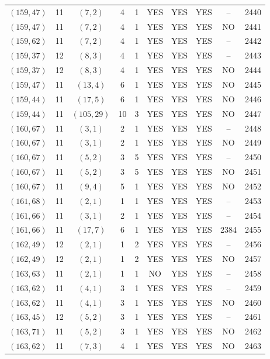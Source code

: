 \begin{longtable}{|c|c|c|c|c|c|c|c|c|c|}
$(159, 47)$ & 11 & $(7, 2)$ & 4 & 1 & YES & YES & YES & -- & 2440\\
$(159, 47)$ & 11 & $(7, 2)$ & 4 & 1 & YES & YES & YES & NO & 2441\\
$(159, 62)$ & 11 & $(7, 2)$ & 4 & 1 & YES & YES & YES & -- & 2442\\
$(159, 37)$ & 12 & $(8, 3)$ & 4 & 1 & YES & YES & YES & -- & 2443\\
$(159, 37)$ & 12 & $(8, 3)$ & 4 & 1 & YES & YES & YES & NO & 2444\\
$(159, 47)$ & 11 & $(13, 4)$ & 6 & 1 & YES & YES & YES & NO & 2445\\
$(159, 44)$ & 11 & $(17, 5)$ & 6 & 1 & YES & YES & YES & NO & 2446\\
$(159, 44)$ & 11 & $(105, 29)$ & 10 & 3 & YES & YES & YES & NO & 2447\\
$(160, 67)$ & 11 & $(3, 1)$ & 2 & 1 & YES & YES & YES & -- & 2448\\
$(160, 67)$ & 11 & $(3, 1)$ & 2 & 1 & YES & YES & YES & NO & 2449\\
$(160, 67)$ & 11 & $(5, 2)$ & 3 & 5 & YES & YES & YES & -- & 2450\\
$(160, 67)$ & 11 & $(5, 2)$ & 3 & 5 & YES & YES & YES & NO & 2451\\
$(160, 67)$ & 11 & $(9, 4)$ & 5 & 1 & YES & YES & YES & NO & 2452\\
$(161, 68)$ & 11 & $(2, 1)$ & 1 & 1 & YES & YES & YES & -- & 2453\\
$(161, 66)$ & 11 & $(3, 1)$ & 2 & 1 & YES & YES & YES & -- & 2454\\
$(161, 66)$ & 11 & $(17, 7)$ & 6 & 1 & YES & YES & YES & 2384 & 2455\\
$(162, 49)$ & 12 & $(2, 1)$ & 1 & 2 & YES & YES & YES & -- & 2456\\
$(162, 49)$ & 12 & $(2, 1)$ & 1 & 2 & YES & YES & YES & NO & 2457\\
$(163, 63)$ & 11 & $(2, 1)$ & 1 & 1 & NO & YES & YES & -- & 2458\\
$(163, 62)$ & 11 & $(4, 1)$ & 3 & 1 & YES & YES & YES & -- & 2459\\
$(163, 62)$ & 11 & $(4, 1)$ & 3 & 1 & YES & YES & YES & NO & 2460\\
$(163, 45)$ & 12 & $(5, 2)$ & 3 & 1 & YES & YES & YES & -- & 2461\\
$(163, 71)$ & 11 & $(5, 2)$ & 3 & 1 & YES & YES & YES & NO & 2462\\
$(163, 62)$ & 11 & $(7, 3)$ & 4 & 1 & YES & YES & YES & NO & 2463\\

\end{longtable}
